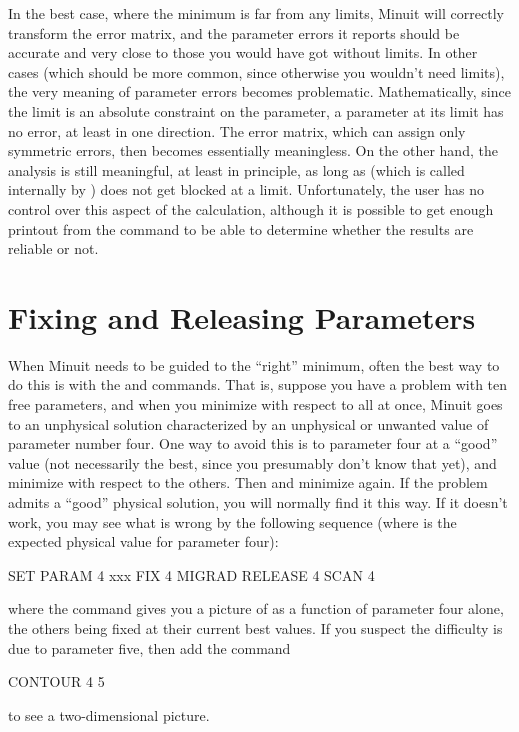 In the best case, where the minimum is far from any limits,
Minuit will correctly transform the error matrix, and the
parameter errors it reports should be accurate and very
close to those you would have got without limits.
In other cases (which should be more common, since
otherwise you wouldn't need limits), the very meaning of
parameter errors becomes problematic.  Mathematically, since
the limit is an absolute constraint on the parameter, a parameter
at its limit has no error, at least in one direction.
The error matrix, which can assign only symmetric errors, then
becomes essentially meaningless.
On the other hand, the  analysis is still meaningful,
at least in principle, as long as  (which is called
internally by ) does not get blocked at a limit.
Unfortunately, the user has no control over this aspect of
the  calculation, although it is possible to get enough
printout from the  command to be able to determine whether
the results are reliable or not.

\section{Fixing and Releasing Parameters}

When Minuit needs to be guided to the ``right'' minimum,
often the best way to do this is with the  
and  commands.
That is, suppose you have a problem with ten free parameters,
and when you minimize with respect to all at once, Minuit goes to
an unphysical solution characterized by an unphysical or unwanted
value of parameter number four.
One way to avoid this is to  parameter four at a ``good'' value
(not necessarily the best, since you presumably don't know that yet),
and minimize with respect to the others. 
Then  and minimize again. 
If the problem admits a ``good'' physical solution, you will
normally find it this way.  
If it doesn't work,
you may see what is wrong by the following sequence
(where  is the expected physical value for parameter four):
\begin{XMP}
SET PARAM 4 xxx
FIX 4
MIGRAD
RELEASE 4
SCAN 4
\end{XMP}
where the  command gives you a picture of  as a 
function of parameter four alone,
the others being fixed at their current best values.
If you suspect the difficulty is due to parameter five,
then add the command
\begin{XMP}
CONTOUR  4  5
\end{XMP}
to see a two-dimensional picture.

